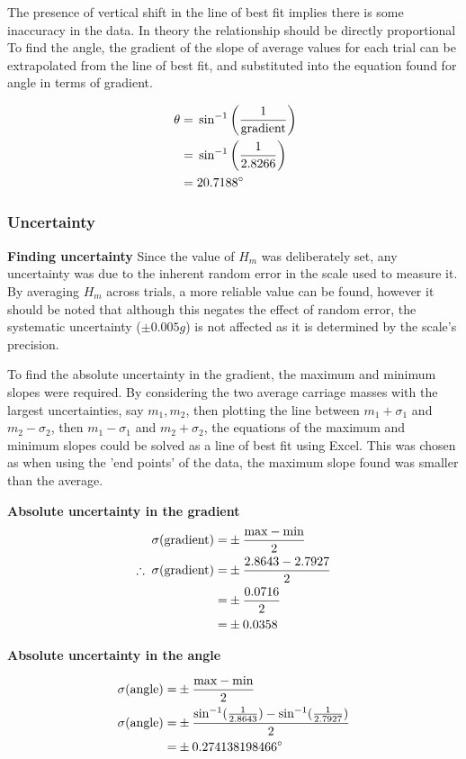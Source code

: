 \documentclass[11pt,a4paper]{article}
\begin{document}
The presence of vertical shift in the line of best fit implies there is some inaccuracy in the data. In theory the relationship should be directly proportional
To find the angle, the gradient of the slope of average values for each trial can be extrapolated from the line of best fit, and substituted into the equation found for angle in terms of gradient.

\begin{align*}
\centering
\;\theta=&\;\sin^{-1}\left(\frac{1}{\textrm{gradient}}\right)\\
 =& \;\sin^{-1}\left(\frac{1}{2.8266}\right)\\
	=&\;20.7188^\circ
\end{align*}

\subsubsection{Uncertainty}

{\large \textbf{Finding uncertainty}\newline}
Since the value of $H_m$ was deliberately set, any uncertainty was due to the inherent random error in the scale used to measure it. By averaging $H_m$ across trials, a more reliable value can be found, however it should be noted that although this negates the effect of random error, the systematic uncertainty ($\pm0.005g$) is not affected as it is determined by the scale's precision.

To find the absolute uncertainty in the gradient, the maximum and minimum slopes were required. By considering the two average carriage masses with the largest uncertainties, say $m_1, m_2$, then plotting the line between $m_1+\sigma_1$ and $m_2-\sigma_2$, then  $m_1-\sigma_1$ and $m_2+\sigma_2$, the equations of the maximum and minimum slopes could be solved as a line of best fit using Excel. This was chosen as when using the 'end points' of the data, the maximum slope found was smaller than the average.
\begin{center}
	\textbf{Absolute uncertainty in the gradient}
	\begin{align*}
		\centering
		\sigma(\textrm{gradient})=&\pm\frac{\textrm{max}-\textrm{min}}{2}\\
		\therefore\;\sigma(\textrm{gradient})=&\pm\frac{2.8643-2.7927}{2}\\
		=&\pm\frac{0.0716}{2}\\
		=&\pm0.0358
	\end{align*}
	
	\textbf{Absolute uncertainty in the angle}
	
	\begin{align*}
		\centering
		\sigma(\textrm{angle})=&\pm\frac{\textrm{max}-\textrm{min}}{2}\\
		\sigma(\textrm{angle})=&\pm\frac{\sin^{-1}(\frac{1}{2.8643})-\sin^{-1}(\frac{1}{2.7927})}{2}\\
		=&\pm0.274138198466^\circ 
	\end{align*}
	
\end{center}
\hfill
\end{document}
